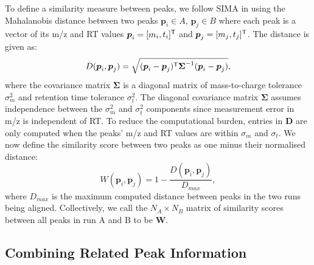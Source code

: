 To define a similarity measure between peaks, we follow SIMA \cite{Voss2011a} in using the Mahalanobis distance between two peaks $\boldsymbol{p}_{i}\in A$, $\boldsymbol{p}_{j}\in B$ where each peak is a vector of its m/z and RT values $\boldsymbol{p}_{i}=[m_{i},t_{i}]^{\mathsf{T}}$ and $\boldsymbol{p}_{j}=[m_{j},t_{j}]^{\mathsf{T}}$. The distance is given as: 
\[
D(\boldsymbol{p}_{i},\boldsymbol{p}_{j})=\sqrt{(\boldsymbol{p}_{i}-\boldsymbol{p}_{j})^{\mathsf{T}}\boldsymbol{\Sigma}^{-1}(\boldsymbol{p}_{i}-\boldsymbol{p}_{j})},
\]
where the covariance matrix $\boldsymbol{\Sigma}$ is a diagonal matrix of mass-to-charge tolerance $\sigma^2_{m}$ and retention time tolerance $\sigma^2_{t}$. The diagonal covariance matrix $\boldsymbol{\Sigma}$ assumes independence between the $\sigma^2_{m}$ and $\sigma^2_{t}$ components since measurement error in m/z is independent of RT. To reduce the computational burden, entries in $\boldsymbol{D}$ are only computed when the peaks' m/z and RT values are within $\sigma_{m}$ and $\sigma_{t}$. We now define the similarity score between two peaks as one minus their normalised distance:
\begin{equation}
W(\boldsymbol{p}_{i},\boldsymbol{p}_{j})=1-\frac{D(\boldsymbol{p}_{i},\boldsymbol{p}_{j})}{D_{max}},
\end{equation}
where $D_{max}$ is the maximum computed distance between peaks in the two runs being aligned. Collectively, we call the $N_A\times N_B$ matrix of similarity scores between all peaks in run A and B to be $\boldsymbol{W}$. 

\subsection{Combining Related Peak Information\label{sub:incorporating-grouping}}

